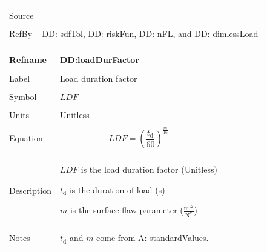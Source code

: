 \documentclass[12pt]{article}
\begin{document}
\begin{minipage}{\textwidth}
\begin{tabular}{>{\raggedright}p{}>{\raggedright\arraybackslash}p{}}
\\ \midrule \\
Source & \cite{astm2009}
         
\\ \midrule \\
RefBy & \hyperref[DD:sdfTol]{DD: sdfTol}, \hyperref[DD:riskFun]{DD: riskFun}, \hyperref[DD:nFL]{DD: nFL}, and \hyperref[DD:dimlessLoad]{DD: dimlessLoad}
        
\\ \bottomrule
\end{tabular}
\end{minipage}

\vspace{\baselineskip}
\noindent
\begin{minipage}{\textwidth}
\begin{tabular}{>{\raggedright}p{}>{\raggedright\arraybackslash}p{}}
\toprule \textbf{Refname} & \textbf{DD:loadDurFactor}
\label{DD:loadDurFactor}
\\ \midrule \\
Label & Load duration factor
        
\\ \midrule \\
Symbol & $LDF$
         
\\ \midrule \\
Units & Unitless
        
\\ \midrule \\
Equation & \begin{displaymath}
           LDF=\left(\frac{{t_{\text{d}}}}{60}\right)^{\frac{m}{16}}
           \end{displaymath}
\\ \midrule \\
Description & \begin{symbDescription}
              \item{$LDF$ is the load duration factor (Unitless)}
              \item{${t_{\text{d}}}$ is the duration of load (s)}
              \item{$m$ is the surface flaw parameter ($\frac{\text{m}^{12}}{\text{N}^{7}}$)}
              \end{symbDescription}
\\ \midrule \\
Notes & ${t_{\text{d}}}$ and $m$ come from \hyperref[assumpSV]{A: standardValues}.
        

\end{tabular}
\end{minipage}
\end{document}
